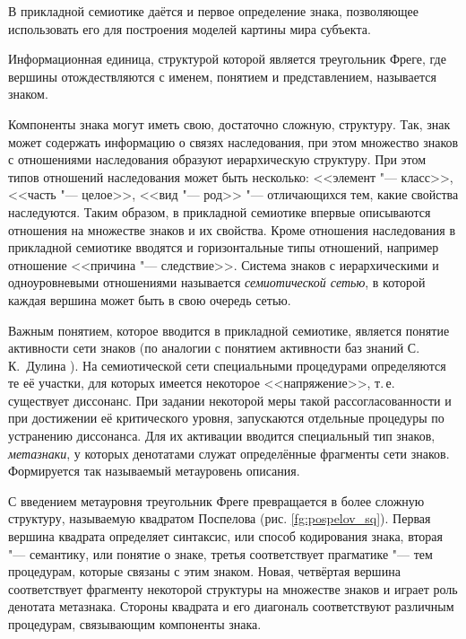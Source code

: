 В прикладной семиотике даётся и первое определение знака, позволяющее использовать его для построения моделей картины мира субъекта.

\begin{Def}
	Информационная единица, структурой которой является треугольник Фреге, где вершины отождествляются с именем, понятием и представлением, называется знаком.
\end{Def}

Компоненты знака могут иметь свою, достаточно сложную, структуру. Так, знак может содержать информацию о связях наследования, при этом множество знаков с отношениями наследования образуют иерархическую структуру. При этом типов отношений наследования может быть несколько: <<элемент "--- класс>>, <<часть "--- целое>>, <<вид "--- род>> "--- отличающихся тем, какие свойства наследуются. Таким образом, в прикладной семиотике впервые описываются отношения на множестве знаков и их свойства. Кроме отношения наследования в прикладной семиотике вводятся и горизонтальные типы отношений, например отношение <<причина "--- следствие>>. Система знаков с иерархическими и одноуровневыми отношениями называется \textit{семиотической сетью}, в которой каждая вершина может быть в свою очередь сетью.

Важным понятием, которое вводится в прикладной семиотике, является понятие активности сети знаков (по аналогии с понятием активности баз знаний С.\,К.~Дулина \cite{Dulin2005}). На семиотической сети специальными процедурами определяются те её участки, для которых имеется некоторое <<напряжение>>, т.\,е. существует диссонанс. При задании некоторой меры такой рассогласованности и при достижении её критического уровня, запускаются отдельные процедуры по устранению диссонанса. Для их активации вводится специальный тип знаков, \textit{метазнаки}, у которых денотатами служат определённые фрагменты сети знаков. Формируется так называемый метауровень описания.

С введением метауровня треугольник Фреге превращается в более сложную структуру, называемую квадратом Поспелова \cite{Osipov2000b} (рис. \ref{fg:pospelov_sq}). Первая вершина квадрата определяет синтаксис, или способ кодирования знака, вторая  "--- семантику, или понятие о знаке, третья соответствует прагматике "--- тем процедурам, которые связаны с этим знаком. Новая, четвёртая вершина соответствует фрагменту некоторой структуры на множестве знаков и играет роль денотата метазнака. Стороны квадрата и его диагональ соответствуют различным процедурам, связывающим компоненты знака. 

